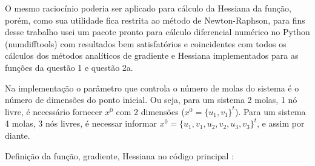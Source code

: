 \documentclass[10pt, a4paper]{article}
\begin{document}
O mesmo raciocínio poderia ser aplicado para cálculo da Hessiana da função, porém, como sua utilidade fica restrita ao
método de Newton-Raphson, para fins desse trabalho usei um pacote pronto para cálculo diferencial numérico no Python 
(numdifftools) com resultados bem satisfatórios e coincidentes com todos os cálculos dos métodos
analíticos de gradiente e Hessiana implementados para as funções da questão 1 e questão 2a.

Na implementação o parâmetro que controla o número de molas do sistema é o número de dimensões do ponto inicial. Ou seja,
para um sistema 2 molas, 1 nó livre, é necessário fornecer $x^0$ com 2 dimensões ($x^0 = \{u_1, v_1\}^t$). Para um
sistema 4 molas, 3 nós livres, é necessar informar $x^0 = \{u_1, v_1, u_2, v_2, u_3, v_3\}^t$, e assim por diante.

\vspace{5mm}
Definição da função, gradiente, Hessiana no código principal :
\end{document}
